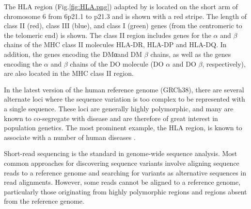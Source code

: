 The HLA region (Fig.\ref{fig:HLA.png}) adapted by \cite{zakharova2019contribution} is located on the short arm of chromosome 6 from 6p21.1 to p21.3 and is shown with a red stripe. The length of class II (red), class III (blue), and class I (green) genes (from the centromeric to the telomeric end) is shown. The class II region includes genes for the $\alpha$ and $\beta$ chains of the MHC class II molecules HLA-DR, HLA-DP and HLA-DQ. In addition, the genes encoding the DMαand DM $\beta$ chains, as well as the genes encoding the $\alpha$ and $\beta$ chains of the DO molecule (DO $\alpha$ and DO $\beta$, respectively), are also located in the MHC class II region.





In the latest version \cite{eggertsson2017graphtyper} of the human reference genome (GRCh38), there are several alternate loci where the sequence variation is too complex to be represented with a single sequence. These loci are generally highly polymorphic, and many are known to co-segregate with disease and are therefore of great interest in population genetics. The most prominent example, the HLA region, is known to associate with a number of human diseases \cite{tiwari2012hla}. 

Short-read sequencing is the standard in genome-wide sequence analysis. Most common approaches for discovering sequence variants involve aligning sequence reads to a reference genome \cite{li2009fast} and searching for variants as alternative sequences in read alignments. However, some reads cannot be aligned to a reference genome, particularly those originating from highly polymorphic regions and regions absent from the reference genome.